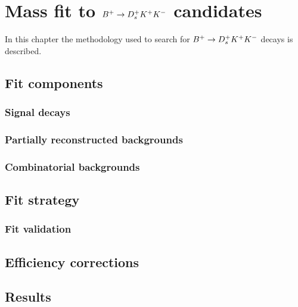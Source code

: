 \chapter{Mass fit to ${{{B}^+}} \rightarrow {\ensuremath{{D}^+_{s}}} {\ensuremath{{K}^+}} {\ensuremath{{K}^-}}$ candidates} 
\label{ch:B2DsKK}

\minitoc

In this chapter the methodology used to search for ${{{B}^+}} \rightarrow {\ensuremath{{D}^+_{s}}} {\ensuremath{{K}^+}} {\ensuremath{{K}^-}}$ decays is described.


\section{Fit components}
\subsection{Signal decays}
\subsection{Partially reconstructed backgrounds}
\subsection{Combinatorial  backgrounds}


\section{Fit strategy}
\subsection{Fit validation}

\section{Efficiency corrections}


\section{Results}